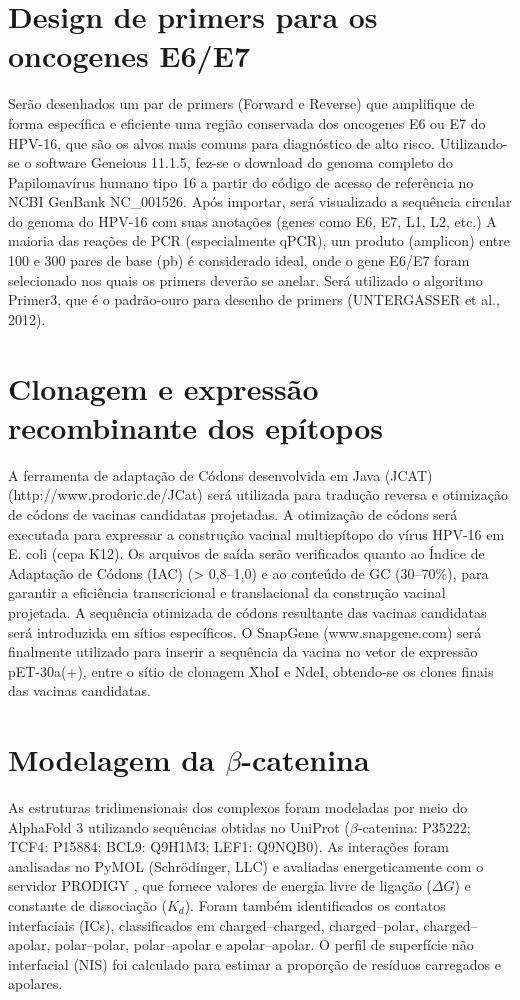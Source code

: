 \section{Design de primers para os oncogenes E6/E7}

Serão desenhados um par de primers (Forward e Reverse) que amplifique de forma específica e eficiente uma região conservada dos oncogenes E6 ou E7 do HPV-16, que são os alvos mais comuns para diagnóstico de alto risco. Utilizando-se o software Geneious 11.1.5, fez-se o download do genoma completo do Papilomavírus humano tipo 16 a partir do código de acesso de referência no NCBI GenBank NC\_001526. Após importar, será visualizado a sequência circular do genoma do HPV-16 com suas anotações (genes como E6, E7, L1, L2, etc.) A maioria das reações de PCR (especialmente qPCR), um produto (amplicon) entre 100 e 300 pares de base (pb) é considerado ideal, onde o gene E6/E7 foram selecionado nos quais os primers deverão se anelar. Será utilizado o algoritmo Primer3, que é o padrão-ouro para desenho de primers (UNTERGASSER et al., 2012).

\section{Clonagem e expressão recombinante dos epítopos}

A ferramenta de adaptação de Códons desenvolvida em Java (JCAT) (http://www.prodoric.de/JCat) será utilizada para tradução reversa e otimização de códons de vacinas candidatas projetadas. A otimização de códons será executada para expressar a construção vacinal multiepítopo do vírus HPV-16 em E. coli (cepa K12). Os arquivos de saída serão verificados quanto ao Índice de Adaptação de Códons (IAC) (> 0,8–1,0) e ao conteúdo de GC (30–70\%), para garantir a eficiência transcricional e translacional da construção vacinal projetada. A sequência otimizada de códons resultante das vacinas candidatas será introduzida em sítios específicos. O SnapGene (www.snapgene.com) será finalmente utilizado para inserir a sequência da vacina no vetor de expressão pET-30a(+), entre o sítio de clonagem XhoI e NdeI, obtendo-se os clones finais das vacinas candidatas.

\section{Modelagem da $\beta$-catenina}

As estruturas tridimensionais dos complexos foram modeladas por meio do AlphaFold 3 \cite{Abramson2024} utilizando sequências obtidas no UniProt ($\beta$‑catenina: P35222; TCF4: P15884; BCL9: Q9H1M3; LEF1: Q9NQB0). As interações foram analisadas no PyMOL (Schrödinger, LLC) e avaliadas energeticamente com o servidor PRODIGY \cite{Xue2016}, que fornece valores de energia livre de ligação ($\Delta G$) e constante de dissociação ($K_d$). Foram também
identificados os contatos interfaciais (ICs), classificados em charged–charged, charged–polar, charged–apolar, polar–polar, polar–apolar e apolar–apolar. O perfil de superfície não interfacial (NIS) foi calculado para estimar a proporção de resíduos carregados e apolares.

